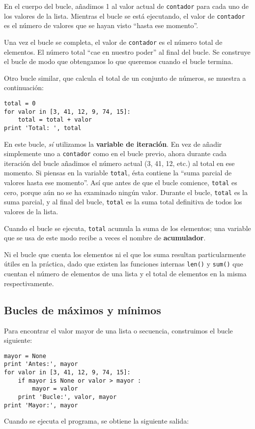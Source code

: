 En el cuerpo del bucle, añadimos 1 al valor actual de {\tt contador}
para cada uno de los valores de la lista. Mientras el bucle se está ejecutando, el
valor de {\tt contador} es el número de valores que se hayan visto ``hasta ese momento''.

Una vez el bucle se completa, el valor de {\tt contador} es el número total
de elementos. El número total ``cae en nuestro poder'' al final del
bucle. Se construye el bucle de modo que obtengamos lo que queremos cuando el
bucle termina.

Otro bucle similar, que calcula el total de un conjunto de números,
se muestra a continuación:

\beforeverb
\begin{verbatim}
total = 0
for valor in [3, 41, 12, 9, 74, 15]:
    total = total + valor
print 'Total: ', total
\end{verbatim}
\afterverb
%
En este bucle, \emph{sí} utilizamos la {\bf variable de iteración}.
En vez de añadir simplemente uno a {\tt contador} como en el bucle previo,
ahora durante cada iteración del bucle añadimos el número actual (3, 41, 12, etc.)
al total en ese momento.
Si piensas en la variable {\tt total}, ésta contiene la
``suma parcial de valores hasta ese momento''. Así que antes de que el bucle
comience, {\tt total} es cero, porque aún no se ha examinado ningún valor.
Durante el bucle, {\tt total} es la suma parcial, y al final del bucle,
{\tt total} es la suma total definitiva de todos los valores
de la lista.

Cuando el bucle se ejecuta, {\tt total} acumula la suma de los elementos;
una variable que se usa de este modo recibe a veces el nombre de
{\bf acumulador}.

Ni el bucle que cuenta los elementos ni el que los suma resultan particularmente
útiles en la práctica, dado que existen las funciones internas
{\tt len()} y {\tt sum()} que cuentan el número de elementos
de una lista y el total de elementos en la misma
respectivamente.

\subsection{Bucles de máximos y mínimos}

\label{maximumloop}
Para encontrar el valor mayor de una lista o secuencia, construimos
el bucle siguiente:

\beforeverb
\begin{verbatim}
mayor = None
print 'Antes:', mayor
for valor in [3, 41, 12, 9, 74, 15]:
    if mayor is None or valor > mayor :
        mayor = valor
    print 'Bucle:', valor, mayor
print 'Mayor:', mayor
\end{verbatim}
\afterverb
%
Cuando se ejecuta el programa, se obtiene la siguiente salida:


